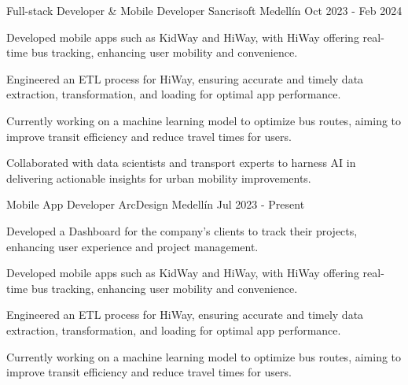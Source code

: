 \newcommand{\quotes}[1]{``#1''}

\begin{cventries}

\cventry
{Full-stack Developer & Mobile Developer} %
{Sancrisoft} %
{Medellín} %
{Oct 2023 - Feb 2024} %
{
  \begin{cvitems} %
    \item {Developed mobile apps such as KidWay and HiWay, with HiWay offering real-time bus tracking, enhancing user mobility and convenience.}
    \item {Engineered an ETL process for HiWay, ensuring accurate and timely data extraction, transformation, and loading for optimal app performance.}
    \item {Currently working on a machine learning model to optimize bus routes, aiming to improve transit efficiency and reduce travel times for users.}
    \item {Collaborated with data scientists and transport experts to harness AI in delivering actionable insights for urban mobility improvements.}
  \end{cvitems}
}
\cventry
{Mobile App Developer} %
{ArcDesign} %
{Medellín} %
{Jul 2023 - Present} %
{
  \begin{cvitems} %
    \item {Developed a Dashboard for the company's clients to track their projects, enhancing user experience and project management.}
    \item {Developed mobile apps such as KidWay and HiWay, with HiWay offering real-time bus tracking, enhancing user mobility and convenience.}
    \item {Engineered an ETL process for HiWay, ensuring accurate and timely data extraction, transformation, and loading for optimal app performance.}
    \item {Currently working on a machine learning model to optimize bus routes, aiming to improve transit efficiency and reduce travel times for users.}

\end{cvitems}}
\end{cventries}
